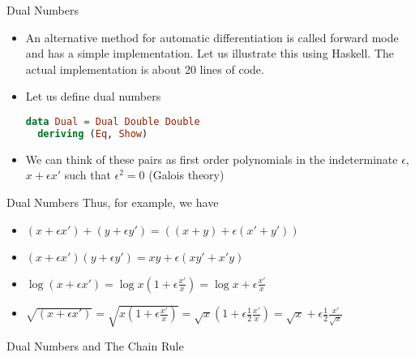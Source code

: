 \documentclass{beamer}
\begin{document}
\begin{frame}[fragile]{Dual Numbers}
\begin{itemize}
\item
An alternative method for automatic differentiation is called forward
mode and has a simple implementation. Let us illustrate this using
Haskell. The actual implementation is about 20 lines of code.
\pause
\item
Let us define dual numbers

\begin{lstlisting}[language=Haskell]
data Dual = Dual Double Double
  deriving (Eq, Show)
\end{lstlisting}
\pause
\item
We can think of these pairs as first order polynomials in the
indeterminate $\epsilon$, $x + \epsilon x'$ such that $\epsilon^2 = 0$
(Galois theory)
\end{itemize}
\end{frame}

\begin{frame}[fragile]{Dual Numbers}
Thus, for example, we have

\begin{itemize}
\pause
\item $(x + \epsilon x') + (y + \epsilon y') = ((x + y) + \epsilon (x' + y'))$
\pause
\item $(x + \epsilon x')(y + \epsilon y') = xy + \epsilon (xy' + x'y)$
\pause
\item $\log (x + \epsilon x') = \log x (1 + \epsilon \frac {x'}{x}) =
  \log x + \epsilon\frac{x'}{x}$
\pause
\item $\sqrt{(x + \epsilon x')} = \sqrt{x(1 + \epsilon\frac{x'}{x})} =
  \sqrt{x}(1 + \epsilon\frac{1}{2}\frac{x'}{x}) = \sqrt{x} +
  \epsilon\frac{1}{2}\frac{x'}{\sqrt{x}}$
\end{itemize}
\end{frame}

\begin{frame}[fragile]{Dual Numbers and The Chain Rule}

\end{frame}
\end{document}
